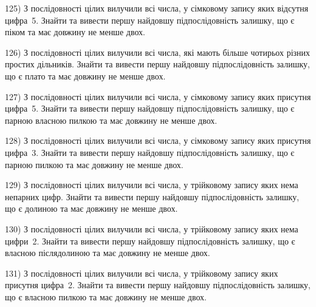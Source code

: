 \documentclass[12pt, ukrainian]{article}
\begin{document}
\par
\vspace{0.9cm}
125) \space 
З послідовності цілих вилучили всі числа, у сімковому запису яких відсутня цифра~5. Знайти та вивести першу найдовшу підпослідовність залишку, що є піком та має довжину не менше двох.

\par
\vspace{0.9cm}
126) \space 
З послідовності цілих вилучили всі числа, які мають більше чотирьох різних простих дільників. Знайти та вивести першу найдовшу підпослідовність залишку, що є плато та має довжину не менше двох.

\par
\vspace{0.9cm}
127) \space 
З послідовності цілих вилучили всі числа, у сімковому запису яких присутня цифра~5. Знайти та вивести першу найдовшу підпослідовність залишку, що є парною власною пилкою та має довжину не менше двох.

\par
\vspace{0.9cm}
128) \space 
З послідовності цілих вилучили всі числа, у сімковому запису яких присутня цифра~3. Знайти та вивести першу найдовшу підпослідовність залишку, що є парною пилкою та має довжину не менше двох.

\par
\vspace{0.9cm}
129) \space 
З послідовності цілих вилучили всі числа, у трійковому запису яких нема непарних цифр. Знайти та вивести першу найдовшу підпослідовність залишку, що є долиною та має довжину не менше двох.

\par
\vspace{0.9cm}
130) \space 
З послідовності цілих вилучили всі числа, у трійковому запису яких нема цифри~2. Знайти та вивести першу найдовшу підпослідовність залишку, що є власною післядолиною та має довжину не менше двох.

\par
\newpage
131) \space 
З послідовності цілих вилучили всі числа, у трійковому запису яких присутня цифра~2. Знайти та вивести першу найдовшу підпослідовність залишку, що є власною пилкою та має довжину не менше двох.
\end{document}
